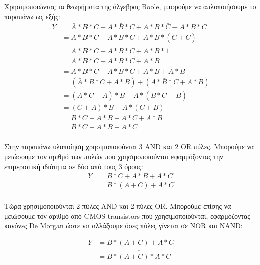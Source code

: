 \documentclass[]{article}
\begin{document}
Χρησιμοποιώντας τα θεωρήματα της άλγεβρας Boole, μπορούμε να απλοποιήσουμε το παραπάνω ως εξής:
\begin{align*}
	Y & = \bar{A} * B * C + A * \bar{B} * C + A * B * \bar{C} + A * B * C \\
	  & = \bar{A} * B * C + A * \bar{B} * C + A * B * (\bar{C} + C)       \\
	  & = \bar{A} * B * C + A * \bar{B} * C + A * B * 1                   \\
	  & = \bar{A} * B * C + A * \bar{B} * C + A * B                       \\
	  & = \bar{A} * B * C + A * \bar{B} * C + A * B + A * B               \\
	  & = (\bar{A} * B * C + A * B) + (A * \bar{B} * C + A * B)           \\
	  & = (\bar{A} * C + A) * B + A * (\bar{B} * C + B)                   \\
	  & = (C + A) * B + A * (C + B)                                       \\
	  & = B * C + A * B + A * C + A * B                                   \\
	  & = B * C + A * B + A * C                                           \\
\end{align*}

Στην παραπάνω υλοποίηση χρησιμοποιούνται 3 AND και 2 OR πύλες. Μπορούμε να μειώσουμε τον αριθμό των πυλών που χρησιμοποιούνται εφαρμόζοντας την επιμεριστική ιδιότητα σε δύο από τους 3 όρους:
\begin{align*}
	Y & = B * C + A * B + A * C \\
	  & = B * (A + C) + A * C   \\
\end{align*}

Τώρα χρησιμοποιούνται 2 πύλες AND και 2 πύλες OR.
Μπορούμε επίσης να μειώσουμε τον αριθμό από CMOS transistors που χρησιμοποιούνται, εφαρμόζοντας κανόνες De Morgan ώστε να αλλάξουμε όσες πύλες γίνεται σε NOR και NAND:

\begin{align*}
	Y & = B * (A + C) + A * C                                  \\
	  & = \overline{\overline{B * (A + C)} * \overline{A * C}} \\
\end{align*}
\end{document}
